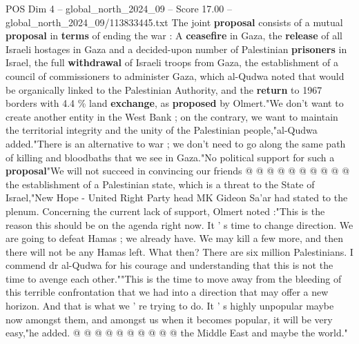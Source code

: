 \begin{textsample}{POS Dim 4 – global\_north\_2024\_09 – Score 17.00 – global\_north\_2024\_09/113833445.txt}
The joint \textbf{proposal} consists of a mutual \textbf{proposal} in \textbf{terms} of ending the war : A \textbf{ceasefire} in Gaza, the \textbf{release} of all Israeli hostages in Gaza and a decided-upon number of Palestinian \textbf{prisoners} in Israel, the full \textbf{withdrawal} of Israeli troops from Gaza, the establishment of a council of commissioners to administer Gaza, which al-Qudwa noted that would be organically linked to the Palestinian Authority, and the \textbf{return} to 1967 borders with 4.4 \% land \textbf{exchange}, as \textbf{proposed} by Olmert."We don't want to create another entity in the West Bank ; on the contrary, we want to maintain the territorial integrity and the unity of the Palestinian people,"al-Qudwa added."There is an alternative to war ; we don't need to go along the same path of killing and bloodbaths that we see in Gaza."No political support for such a \textbf{proposal}"We will not succeed in convincing our friends @ @ @ @ @ @ @ @ @ @ the establishment of a Palestinian state, which is a threat to the State of Israel,"New Hope - United Right Party head MK Gideon Sa'ar had stated to the plenum.
Concerning the current lack of support, Olmert noted :"This is the reason this should be on the agenda right now.
It ' s time to change direction.
We are going to defeat Hamas ; we already have.
We may kill a few more, and then there will not be any Hamas left.
What then?
There are six million Palestinians.
I commend dr al-Qudwa for his courage and understanding that this is not the time to avenge each other.""This is the time to move away from the bleeding of this terrible confrontation that we had into a direction that may offer a new horizon.
And that is what we ' re trying to do.
It ' s highly unpopular maybe now amongst them, and amongst us when it becomes popular, it will be very easy,"he added. @ @ @ @ @ @ @ @ @ @ the Middle East and maybe the world."

\end{textsample}
